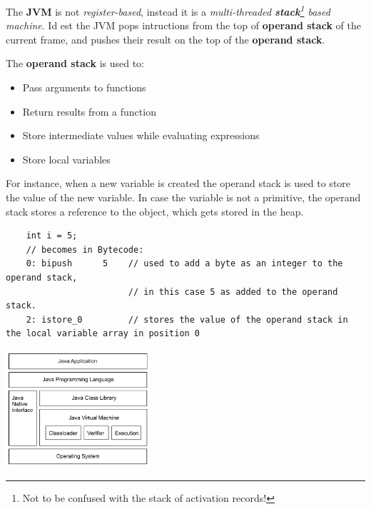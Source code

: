 The \textbf{JVM} is not \textit{register-based}, instead it is a \textit{multi-threaded \textbf{stack}\footnote{Not to be confused with the stack of activation records!} based machine}.
Id est the JVM pops intructions from the top of \textbf{operand stack} of the current frame, and pushes their result on the top of the \textbf{operand stack}. 
{The \textbf{operand stack} is used to:\ns
\begin{itemize}
    \item Pass arguments to functions
    \item Return results from a function
    \item Store intermediate values while evaluating expressions
    \item Store local variables
\end{itemize}}
For instance, when a new variable is created the operand stack is used to store the value of the new variable. In case the variable is not a primitive, the operand stack stores a reference to the object, which gets stored in the heap.
\begin{lstlisting}
    int i = 5;
    // becomes in Bytecode:
    0: bipush      5    // used to add a byte as an integer to the operand stack, 
                        // in this case 5 as added to the operand stack.
    2: istore_0         // stores the value of the operand stack in the local variable array in position 0
\end{lstlisting}
\begin{center}
    \includegraphics[width=0.4\textwidth]{images/Java_hierarchy.png}
\end{center}

